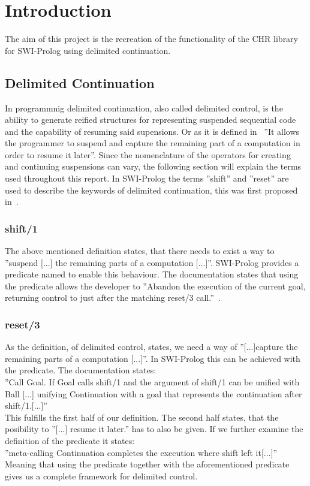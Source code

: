 \section{Introduction}
The aim of this project is the recreation of the functionality of the CHR library for SWI-Prolog using delimited continuation.

\subsection{Delimited Continuation}
In programmnig delimited continuation, also called delimited control, is the ability to generate reified structures for representing suspended sequential code and the capability of resuming said supensions.
Or as it is defined in~\cite{schrijvers2013delimited} ''It allows the programmer to suspend and capture the remaining part of a computation in order to resume it later''.
Since the nomenclature of the operators for creating and continuing suspensions can vary, the following section will explain the terms used throughout this report.
In SWI-Prolog the terms ''shift'' and ''reset'' are used to describe the keywords of delimited continuation, this was first proposed in~\cite{danvy1990abstracting}.

\subsubsection{shift/1}
The above mentioned definition states, that there needs to exist a way to ''suspend [...] the remaining parts of a computation [...]''.
SWI-Prolog provides a predicate named  to enable this behaviour.
The documentation states that using the  predicate allows the developer to ''Abandon the execution of the current goal, returning control to just after the matching reset/3 call.''~\cite{swipl:doc:shift}.


\subsubsection{reset/3}
As the definition, of delimited control, states, we need a way of ''[...]capture the remaining parts of a computation [...]''.
In SWI-Prolog this can be achieved with the  predicate.
The documentation states:\\
''Call Goal. If Goal calls shift/1 and the argument of shift/1 can be unified with Ball [...] unifying Continuation with a goal that represents the continuation after shift/1.[...]''~\cite{swipl:doc:reset}\\
This fulfills the first half of our definition.
The second half states, that the posibility to ''[...] resume it later.'' has to also be given.
If we further examine the definition of the  predicate it states:\\
''meta-calling Continuation completes the execution where shift left it[...]''~\cite{swipl:doc:reset}\\
Meaning that using the  predicate together with the aforementioned  predicate gives us a complete framework for delimited control.

\newpage
